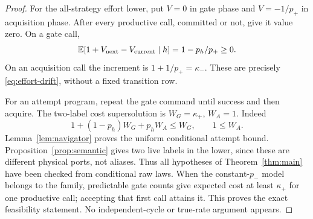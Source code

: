 \begin{proof}
For the all-strategy effort lower, put $V=0$ in gate phase and $V=-1/p_+$ in acquisition phase. After every productive call, committed or not, give it value zero. On a gate call,
\[
 \mathbb E[1+V_{\rm next}-V_{\rm current}\mid h]=1-p_h/p_+\ge0.
\]
On an acquisition call the increment is $1+1/p_+=\kappa_-$. These are precisely \eqref{eq:effort-drift}, without a fixed transition row.

For an attempt program, repeat the gate command until success and then acquire. The two-label cost supersolution is $W_G=\kappa_+$, $W_A=1$. Indeed
\[
 1+(1-p_h)W_G+p_hW_A\le W_G,\qquad 1\le W_A.
\]
Lemma~\ref{lem:navigator} proves the uniform conditional attempt bound. Proposition~\ref{prop:semantic} gives two live labels in the lower, since these are different physical ports, not aliases. Thus all hypotheses of Theorem~\ref{thm:main} have been checked from conditional raw laws. When the constant-$p_-$ model belongs to the family, predictable gate counts give expected cost at least $\kappa_+$ for one productive call; accepting that first call attains it. This proves the exact feasibility statement. No independent-cycle or true-rate argument appears.
\end{proof}
